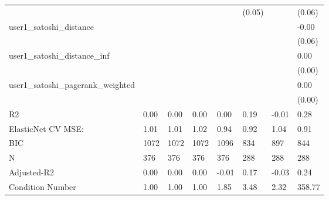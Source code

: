 \begin{table}
\begin{center}
\begin{tabular}{llllllll}
                                               &          &            &         &         & (0.05)   &                    & (0.06)   \\
user1_satoshi_distance                         &          &            &         &         &          &                    & -0.00    \\
                                               &          &            &         &         &          &                    & (0.06)   \\
user1_satoshi_distance_inf                     &          &            &         &         &          &                    & 0.00     \\
                                               &          &            &         &         &          &                    & (0.00)   \\
user1_satoshi_pagerank_weighted                &          &            &         &         &          &                    & 0.00     \\
                                               &          &            &         &         &          &                    & (0.00)   \\
R2                                             & 0.00     & 0.00       & 0.00    & 0.00    & 0.19     & -0.01              & 0.28     \\
ElasticNet CV MSE:                             & 1.01     & 1.01       & 1.02    & 0.94    & 0.92     & 1.04               & 0.91     \\
BIC                                            & 1072     & 1072       & 1072    & 1096    & 834      & 897                & 844      \\
N                                              & 376      & 376        & 376     & 376     & 288      & 288                & 288      \\
Adjusted-R2                                    & 0.00     & 0.00       & 0.00    & -0.01   & 0.17     & -0.03              & 0.24     \\
Condition Number                               & 1.00     & 1.00       & 1.00    & 1.85    & 3.48     & 2.32               & 358.77   \\
\hline
\end{tabular}
\end{center}
\end{table}